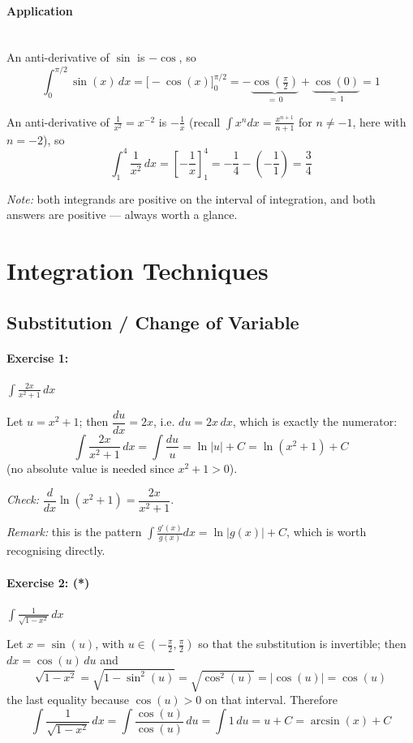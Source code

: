 \documentclass[]{article}
\begin{document}
	\paragraph{Application}\mbox{}\\
	An anti-derivative of $\sin$ is $-\cos$, so
	$$
	\int_0^{\pi/2} \sin(x)\,dx = \Big[ -\cos(x) \Big]_0^{\pi/2} = -\underbrace{\cos\left(\tfrac{\pi}{2}\right)}_{=\,0} + \underbrace{\cos(0)}_{=\,1} = 1
	$$

	An anti-derivative of $\frac{1}{x^2} = x^{-2}$ is $-\frac{1}{x}$ (recall $\int x^n dx = \frac{x^{n+1}}{n+1}$ for $n \neq -1$, here with $n = -2$), so
	$$
	\int_1^4 \frac{1}{x^2}\,dx = \left[ -\frac{1}{x} \right]_1^4 = -\frac{1}{4} - \left(-\frac{1}{1}\right) = \frac{3}{4}
	$$

	\textit{Note:} both integrands are positive on the interval of integration, and both answers are positive --- always worth a glance.


	\section{Integration Techniques}

	\subsection*{Substitution / Change of Variable}

	\paragraph{Exercise 1:} $\displaystyle \int \frac{2x}{x^2+1}\,dx$

	Let $u = x^2 + 1$; then $\dfrac{du}{dx} = 2x$, i.e. $du = 2x\,dx$, which is exactly the numerator:
	$$
	\int \frac{2x}{x^2+1}\,dx = \int \frac{du}{u} = \ln|u| + C = \ln\left(x^2+1\right) + C
	$$
	(no absolute value is needed since $x^2 + 1 > 0$).

	\textit{Check:} $\dfrac{d}{dx}\ln(x^2+1) = \dfrac{2x}{x^2+1}$. \checkmark

	\textit{Remark:} this is the pattern $\int \frac{g'(x)}{g(x)}dx = \ln|g(x)| + C$, which is worth recognising directly.

	\paragraph{Exercise 2: (*)} $\displaystyle \int \frac{1}{\sqrt{1-x^2}}\,dx$

	Let $x = \sin(u)$, with $u \in \left(-\frac{\pi}{2}, \frac{\pi}{2}\right)$ so that the substitution is invertible; then $dx = \cos(u)\,du$ and
	$$
	\sqrt{1-x^2} = \sqrt{1 - \sin^2(u)} = \sqrt{\cos^2(u)} = \left| \cos(u) \right| = \cos(u)
	$$
	the last equality because $\cos(u) > 0$ on that interval. Therefore
	$$
	\int \frac{1}{\sqrt{1-x^2}}\,dx = \int \frac{\cos(u)}{\cos(u)}\,du = \int 1 \,du = u + C = \arcsin(x) + C
	$$
\end{document}
